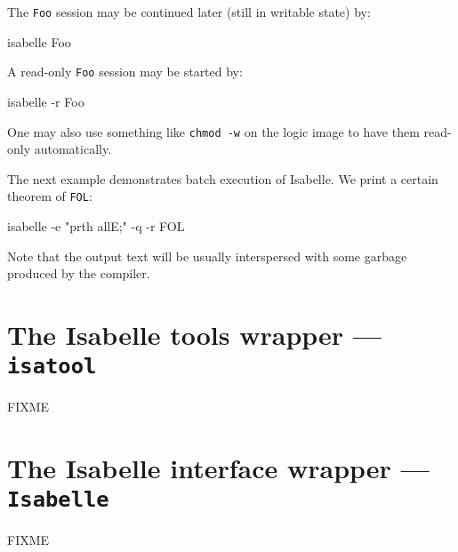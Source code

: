 The \texttt{Foo} session may be continued later (still in writable
state) by:
\begin{ttbox}
isabelle Foo
\end{ttbox}
A read-only \texttt{Foo} session may be started by:
\begin{ttbox}
isabelle -r Foo
\end{ttbox}
One may also use something like \texttt{chmod~-w} on the logic image
to have them read-only automatically.

\medskip The next example demonstrates batch execution of Isabelle. We
print a certain theorem of \texttt{FOL}:
\begin{ttbox}
isabelle -e "prth allE;" -q -r FOL
\end{ttbox}
Note that the output text will be usually interspersed with some
garbage produced by the {\ML} compiler.


\section{The Isabelle tools wrapper --- \texttt{isatool}} \label{sec:isatool}

FIXME

\section{The Isabelle interface wrapper --- \texttt{Isabelle}} \label{sec:interface}

FIXME

